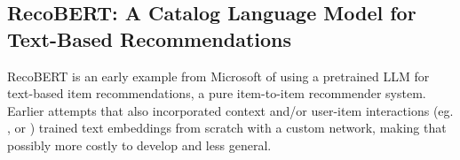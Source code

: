 \documentclass[11pt]{article}
\begin{document}





\subsection{RecoBERT: A Catalog Language Model for Text-Based Recommendations \cite{Malkiel2020}}

RecoBERT is an early example from Microsoft of using a pretrained LLM for text-based item recommendations, a pure item-to-item recommender system. Earlier attempts that also incorporated context and/or user-item interactions (eg. \cite{Djuric2015}, \cite{Zheng2017} or \cite{deSouza2018}) trained text embeddings from scratch with a custom network, making that possibly more costly to develop and less general. 
\end{document}
